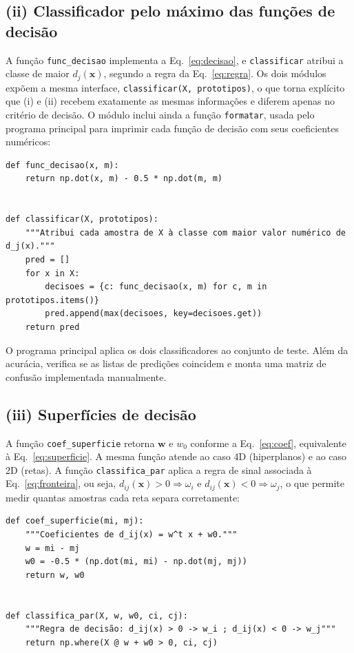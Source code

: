 \documentclass[12pt,a4paper]{article}
\begin{document}
\subsection{(ii) Classificador pelo máximo das funções de decisão}

A função \texttt{func\_decisao} implementa a Eq.~\eqref{eq:decisao}, e \texttt{classificar} atribui a classe de maior $d_j(\mathbf{x})$, segundo a regra da Eq.~\eqref{eq:regra}. Os dois módulos expõem a mesma interface, \texttt{classificar(X, prototipos)}, o que torna explícito que (i) e (ii) recebem exatamente as mesmas informações e diferem apenas no critério de decisão. O módulo inclui ainda a função \texttt{formatar}, usada pelo programa principal para imprimir cada função de decisão com seus coeficientes numéricos:

\begin{lstlisting}[firstnumber=12,title=\texttt{funcao\_decisao.py}]
def func_decisao(x, m):
    return np.dot(x, m) - 0.5 * np.dot(m, m)


def classificar(X, prototipos):
    """Atribui cada amostra de X à classe com maior valor numérico de d_j(x)."""
    pred = []
    for x in X:
        decisoes = {c: func_decisao(x, m) for c, m in prototipos.items()}
        pred.append(max(decisoes, key=decisoes.get))
    return pred
\end{lstlisting}

O programa principal aplica os dois classificadores ao conjunto de teste. Além da acurácia, verifica se as listas de predições coincidem e monta uma matriz de confusão implementada manualmente.

\subsection{(iii) Superfícies de decisão}

A função \texttt{coef\_superficie} retorna $\mathbf{w}$ e $w_0$ conforme a Eq.~\eqref{eq:coef}, equivalente à Eq.~\eqref{eq:superficie}. A mesma função atende ao caso 4D (hiperplanos) e ao caso 2D (retas). A função \texttt{classifica\_par} aplica a regra de sinal associada à Eq.~\eqref{eq:fronteira}, ou seja, $d_{ij}(\mathbf{x}) > 0 \Rightarrow \omega_i$ e $d_{ij}(\mathbf{x}) < 0 \Rightarrow \omega_j$, o que permite medir quantas amostras cada reta separa corretamente:

\begin{lstlisting}[firstnumber=11,title=\texttt{superficie\_decisao.py}]
def coef_superficie(mi, mj):
    """Coeficientes de d_ij(x) = w^t x + w0."""
    w = mi - mj
    w0 = -0.5 * (np.dot(mi, mi) - np.dot(mj, mj))
    return w, w0


def classifica_par(X, w, w0, ci, cj):
    """Regra de decisão: d_ij(x) > 0 -> w_i ; d_ij(x) < 0 -> w_j"""
    return np.where(X @ w + w0 > 0, ci, cj)
\end{lstlisting}
\end{document}
